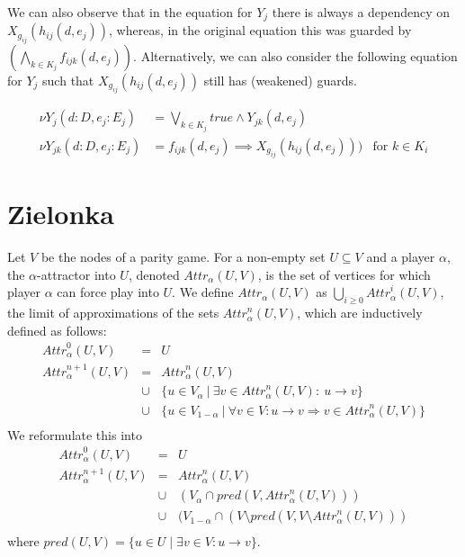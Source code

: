 \documentclass{article}
\newcommand{\attrsym}{\ensuremath{\textit{Attr}}}
\newcommand{\attr}[3][]{\ensuremath{\attrsym^{#1}_{#2}(#3)}}
\newcommand{\pred}{\ensuremath{\textit{pred}}}
\begin{document}
We can also observe that in the equation for $Y_j$ there is always a dependency on $X_{g_{ij}}(h_{ij}(d, e_j))$, whereas, in the original equation this was guarded by $(\bigwedge\limits_{k \in K_j} f_{ijk}(d,e_j))$.
Alternatively, we can also consider the following equation for $Y_j$ such that $X_{g_{ij}}(h_{ij}(d, e_j))$ still has (weakened) guards.

\begin{align*}
  \nu Y_j(d : D, e_j : E_j) &= \bigvee\limits_{k \in K_j} \textit{true} \land Y_{jk}(d, e_j) \\
  \nu Y_{jk}(d : D, e_j : E_j) &= f_{ijk}(d,e_j) \implies X_{g_{ij}}(h_{ij}(d, e_j))) & \text{for } k \in K_i
\end{align*}

\newpage
\section{Zielonka}
Let $V$ be the nodes of a parity game.
For a non-empty set $U \subseteq V$ and a player $\alpha$, the
$\alpha$-attractor into $U$, denoted $\attr{\alpha}{U,V}$,
is the set of vertices for which player
$\alpha$ can force play into $U$. We define $\attr{\alpha}{U,V}$ as
$\bigcup\limits_{i \ge 0} \attr[i]{\alpha}{U,V}$,
the limit of approximations\label{def:attractor} of the
sets $\attr[n]{\alpha}{U,V}$, which are inductively defined as follows:
\[
\begin{array}{lcl}
\attr[0]{\alpha}{U, V} & = & U \\
\attr[n+1]{\alpha}{U, V} & = & \attr[n]{\alpha}{U, V} \\
      & \cup & \{u \in V_{\alpha} ~|~ \exists v \in \attr[n]{\alpha}{U,V}:~ u \to v \} \\
      & \cup & \{u \in V_{1 - \alpha} ~|~ \forall v \in V: u \to v \Rightarrow v \in \attr[n]{\alpha}{U, V}\} \\
\end{array}
\]
We reformulate this into
\[
\begin{array}{lcl}
\attr[0]{\alpha}{U, V} & = & U \\
\attr[n+1]{\alpha}{U, V} & = & \attr[n]{\alpha}{U, V} \\
      & \cup & (V_{\alpha} \cap \pred(V, \attr[n]{\alpha}{U, V})) \\
      & \cup & (V_{1 - \alpha} \cap (V \setminus \pred(V, V \setminus \attr[n]{\alpha}{U,V})) \\
\end{array}
\]
where $\pred(U, V) = \{ u \in U \mid \exists v \in V: u \rightarrow v \}$.
\end{document}

